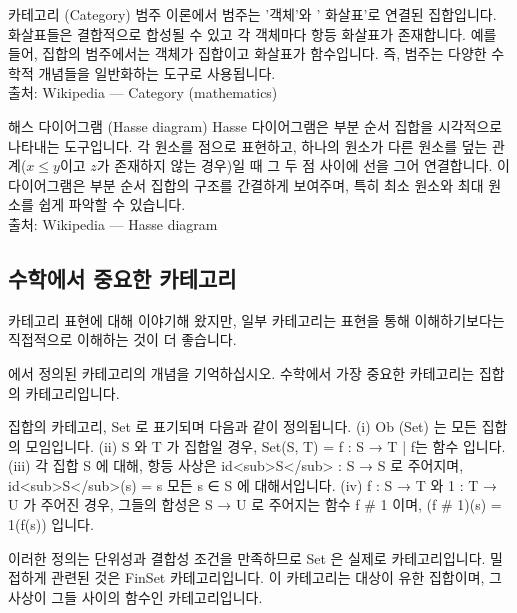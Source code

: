 \documentclass[11pt, a4paper, twoside, openany]{book}
\begin{document}
{\begin{deepresearch}{카테고리 (Category)}
범주 이론에서 범주는 '객체'와 ' 화살표'로 연결된 집합입니다.  화살표들은 결합적으로 합성될 수 있고 각 객체마다 항등 화살표가 존재합니다. 예를 들어, 집합의 범주에서는 객체가 집합이고 화살표가 함수입니다.  즉, 범주는 다양한 수학적 개념들을 일반화하는 도구로 사용됩니다.
\\[4pt]{\footnotesize\color{ctgray} 출처: Wikipedia — Category (mathematics)}
\end{deepresearch}

\begin{deepresearch}{해스 다이어그램 (Hasse diagram)}
Hasse 다이어그램은 부분 순서 집합을 시각적으로 나타내는 도구입니다. 각 원소를 점으로 표현하고, 하나의 원소가 다른 원소를 덮는 관계($x \leq y$이고 $z$가 존재하지 않는 경우)일 때 그 두 점 사이에 선을 그어 연결합니다. 이 다이어그램은 부분 순서 집합의 구조를 간결하게 보여주며, 특히 최소 원소와 최대 원소를 쉽게 파악할 수 있습니다.
\\[4pt]{\footnotesize\color{ctgray} 출처: Wikipedia — Hasse diagram}
\end{deepresearch}


\subsection{수학에서 중요한 카테고리}
\label{sec:3-2-4}

카테고리 표현에 대해 이야기해 왔지만, 일부 카테고리는 표현을 통해 이해하기보다는 직접적으로 이해하는 것이 더 좋습니다. 
\begin{definitionbox}[정의 3.6]
에서 정의된 카테고리의 개념을 기억하십시오. 수학에서 가장 중요한 카테고리는 집합의 카테고리입니다.
\end{definitionbox}

\par\medskip
\begin{definitionbox}[정의 3.24.]
집합의 카테고리, Set 로 표기되며 다음과 같이 정의됩니다.
(i) Ob (Set) 는 모든 집합의 모임입니다.
(ii) S 와 T 가 집합일 경우, Set(S, T) = {f : S → T | f\hspace{0pt}는 함수} 입니다.
(iii) 각 집합 S 에 대해, 항등 사상은 id<sub>S</sub> : S → S 로 주어지며, id<sub>S</sub>(s) = s  모든 s ∈ S 에 대해서입니다.
(iv) f : S → T 와 1 : T → U 가 주어진 경우, 그들의 합성은 S → U 로 주어지는 함수 f \# 1 이며, (f \# 1)(s) = 1(f(s)) 입니다.
\end{definitionbox}

\par\medskip
이러한 정의는 단위성과 결합성 조건을 만족하므로 Set 은 실제로 카테고리입니다.
밀접하게 관련된 것은 FinSet 카테고리입니다. 이 카테고리는 대상이 유한 집합이며, 그 사상이 그들 사이의 함수인 카테고리입니다.

}
\end{document}
